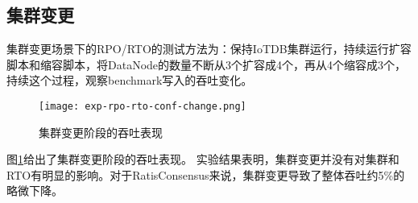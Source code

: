 \subsection{集群变更}

集群变更场景下的RPO/RTO的测试方法为：保持IoTDB集群运行，持续运行扩容脚本和缩容脚本，将DataNode的数量不断从3个扩容成4个，再从4个缩容成3个，持续这个过程，观察benchmark写入的吞吐变化。


\begin{figure}
    \centering
    \texttt{[image: exp-rpo-rto-conf-change.png]}
    \caption{集群变更阶段的吞吐表现}
    \label{fig:exp-rpo-rto-conf-change}
\end{figure}

图\ref{fig:exp-rpo-rto-conf-change}给出了集群变更阶段的吞吐表现。
实验结果表明，集群变更并没有对集群和RTO有明显的影响。对于RatisConsensus来说，集群变更导致了整体吞吐约5\%的略微下降。






